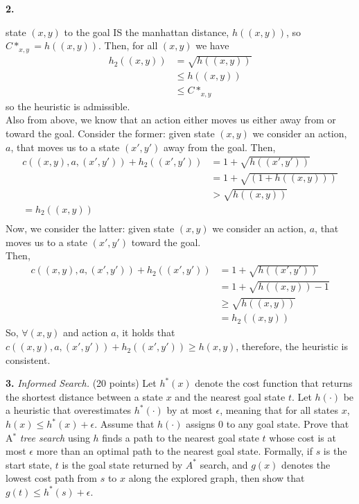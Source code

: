 \documentclass[12pt]{amsart}
\newenvironment{statement}[1]{\smallskip\noindent\color[rgb]{0.0,0.0,0.0} {\bf #1.}}{}
\theoremstyle{definition}
\theoremstyle{remark}
\newcommand{\1}{\mathds{1}}
\begin{document}
\begin{statement}{2}
\begin{enumerate}
    state $(x, y)$ to the goal IS the manhattan distance, $h((x, y))$, so $C*_{x, y} = h((x, y))$. Then, for all $(x, y)$ we have 
    \begin{align*}
        h_2((x, y)) &= \sqrt{h((x, y))} \\ 
        &\leq h((x, y))\\ 
        & \leq C*_{x, y}
    \end{align*}
    so the heuristic is admissible. \\ 
    Also from above, we know that an action either moves us either away from or toward the goal. Consider the former: given state 
    $(x, y)$ we consider an action, $a$, that moves us to a state $(x', y')$ away from the goal. Then, 
    \begin{align*}
        c((x, y), a, (x', y')) + h_2((x', y')) &= 1 + \sqrt{h((x', y'))} \\ 
        &= 1 + \sqrt{(1 + h((x, y)))} \\ 
        &> \sqrt{h((x, y))} \\ 
        = h_2((x, y))\\ 
    \end{align*}
    Now, we consider the latter: given state 
    $(x, y)$ we consider an action, $a$, that moves us to a state $(x', y')$ toward the goal. \\Then, 
    \begin{align*}
        c((x, y), a, (x', y')) + h_2((x', y')) &= 1 + \sqrt{h((x', y'))} \\ 
        &= 1 + \sqrt{h((x, y)) - 1} \\ 
        &\geq \sqrt{h((x, y))} \\ 
        &= h_2((x, y)) 
    \end{align*}
    So, $\forall (x, y)$ and action $a$, it holds that $c((x, y), a, (x', y')) + h_2((x', y')) \geq h(x, y)$, therefore, the heuristic is 
    consistent.
\end{enumerate}
\end{statement}

\newpage
\begin{statement}{3} \textit{Informed Search.} (20 points) Let $h^*(x)$ denote the cost function that returns the shortest distance between a state $x$ and the nearest goal state $t$. Let $h(\cdot)$ be a heuristic that overestimates $h^*(\cdot)$ by at most $\epsilon$, meaning that for all states $x$, $h(x) \leq h^*(x) + \epsilon$. Assume that $h(\cdot)$ assigns $0$ to any goal state. Prove that A$^*$ \textit{tree search} using $h$ finds a path to the nearest goal state $t$ whose cost is at most $\epsilon$ more than an optimal path to the nearest goal state. Formally, if $s$ is the start state, $t$ is the goal state returned by $A^*$ search, and $g(x)$ denotes the lowest cost path from $s$ to $x$ along the explored graph, then show that $g(t) \leq h^*(s) + \epsilon$.

\end{statement}
\end{document}
